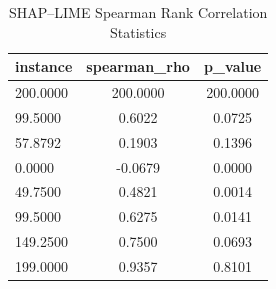 \begin{table}
\centering
\caption{SHAP–LIME Spearman Rank Correlation Statistics}
\label{tab:agreement}
\begin{tabular}{lcc}
\toprule
instance & spearman_rho & p_value \\
\midrule
200.0000 & 200.0000 & 200.0000 \\
99.5000 & 0.6022 & 0.0725 \\
57.8792 & 0.1903 & 0.1396 \\
0.0000 & -0.0679 & 0.0000 \\
49.7500 & 0.4821 & 0.0014 \\
99.5000 & 0.6275 & 0.0141 \\
149.2500 & 0.7500 & 0.0693 \\
199.0000 & 0.9357 & 0.8101 \\
\bottomrule
\end{tabular}
\end{table}
